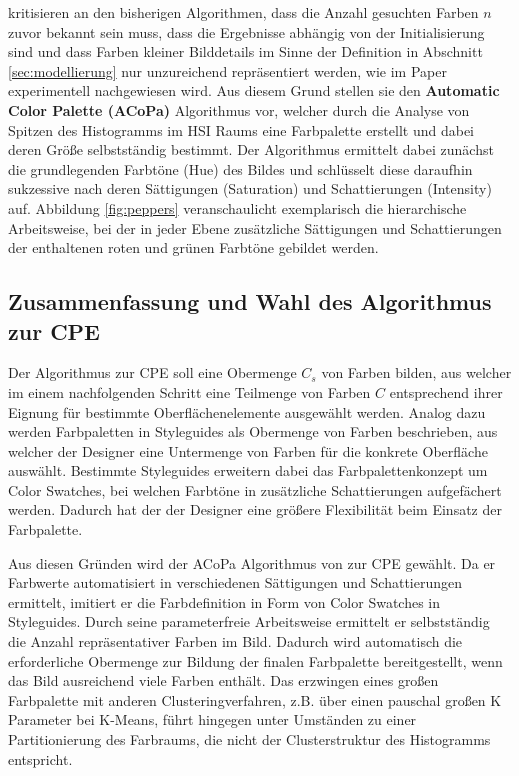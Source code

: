 \documentclass[11pt, bibliography=totoc]{scrartcl}
\begin{document}
\citet{acopa} kritisieren an den bisherigen Algorithmen, dass die Anzahl gesuchten Farben $n$ zuvor bekannt sein muss, dass die Ergebnisse abhängig von der Initialisierung sind und dass Farben kleiner Bilddetails im Sinne der Definition in Abschnitt \ref{sec:modellierung} nur unzureichend repräsentiert werden, wie im Paper experimentell nachgewiesen wird. Aus diesem Grund stellen sie den \textbf{Automatic Color Palette (ACoPa)} Algorithmus vor, welcher durch die Analyse von Spitzen des Histogramms im HSI Raums eine Farbpalette erstellt und dabei deren Größe selbstständig bestimmt. Der Algorithmus ermittelt dabei zunächst die grundlegenden Farbtöne (Hue) des Bildes und schlüsselt diese daraufhin sukzessive nach deren Sättigungen (Saturation) und Schattierungen (Intensity) auf. Abbildung \ref{fig:peppers} veranschaulicht exemplarisch die hierarchische Arbeitsweise, bei der in jeder Ebene zusätzliche Sättigungen und Schattierungen der enthaltenen roten und grünen Farbtöne gebildet werden.

\subsection*{Zusammenfassung und Wahl des Algorithmus zur CPE}

Der Algorithmus zur CPE soll eine Obermenge $C_s$ von Farben bilden, aus welcher im einem nachfolgenden Schritt eine Teilmenge von Farben $C$ entsprechend ihrer Eignung für bestimmte Oberflächenelemente ausgewählt werden. Analog dazu werden Farbpaletten in Styleguides als Obermenge von Farben beschrieben, aus welcher der Designer eine Untermenge von Farben für die konkrete Oberfläche auswählt. Bestimmte Styleguides erweitern dabei das Farbpalettenkonzept um Color Swatches, bei welchen Farbtöne in zusätzliche Schattierungen aufgefächert werden. Dadurch hat der der Designer eine größere Flexibilität beim Einsatz der Farbpalette.

Aus diesen Gründen wird der ACoPa Algorithmus von \citet{acopa} zur CPE gewählt. Da er Farbwerte automatisiert in verschiedenen Sättigungen und Schattierungen ermittelt, imitiert er die Farbdefinition in Form von Color Swatches in Styleguides. Durch seine parameterfreie Arbeitsweise ermittelt er selbstständig die Anzahl repräsentativer Farben im Bild. Dadurch wird automatisch die erforderliche Obermenge zur Bildung der finalen Farbpalette bereitgestellt, wenn das Bild ausreichend viele Farben enthält. Das erzwingen eines großen Farbpalette mit anderen Clusteringverfahren, z.B. über einen pauschal großen K Parameter bei K-Means, führt hingegen unter Umständen zu einer Partitionierung des Farbraums, die nicht der Clusterstruktur des Histogramms entspricht.
\end{document}
